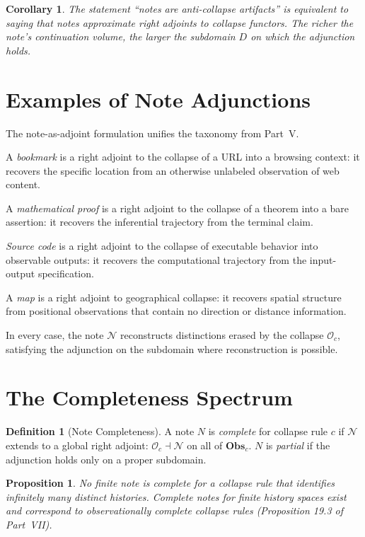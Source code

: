 \documentclass[12pt, a4paper, openany]{book}
\theoremstyle{plain}
\newtheorem{proposition}[theorem]{Proposition}
\newtheorem{corollary}[theorem]{Corollary}
\theoremstyle{definition}
\newtheorem{definition}[theorem]{Definition}
\theoremstyle{remark}
\newcommand{\Obs}{\mathbf{Obs}}
\begin{document}
\begin{corollary}
The statement ``notes are anti-collapse artifacts'' is equivalent to saying that
notes approximate right adjoints to collapse functors. The richer the note's
continuation volume, the larger the subdomain $D$ on which the adjunction holds.
\end{corollary}

\section{Examples of Note Adjunctions}

The note-as-adjoint formulation unifies the taxonomy from Part~V.

A \emph{bookmark} is a right adjoint to the collapse of a URL into a browsing
context: it recovers the specific location from an otherwise unlabeled observation
of web content.

A \emph{mathematical proof} is a right adjoint to the collapse of a theorem
into a bare assertion: it recovers the inferential trajectory from the terminal
claim.

\emph{Source code} is a right adjoint to the collapse of executable behavior
into observable outputs: it recovers the computational trajectory from the
input-output specification.

A \emph{map} is a right adjoint to geographical collapse: it recovers spatial
structure from positional observations that contain no direction or distance
information.

In every case, the note $\mathcal{N}$ reconstructs distinctions erased by the
collapse $\mathcal{O}_c$, satisfying the adjunction on the subdomain where
reconstruction is possible.

\section{The Completeness Spectrum}

\begin{definition}[Note Completeness]
A note $N$ is \emph{complete} for collapse rule $c$ if $\mathcal{N}$ extends to a
global right adjoint: $\mathcal{O}_c \dashv \mathcal{N}$ on all of $\Obs_c$.
$N$ is \emph{partial} if the adjunction holds only on a proper subdomain.
\end{definition}

\begin{proposition}
No finite note is complete for a collapse rule that identifies infinitely many
distinct histories. Complete notes for finite history spaces exist and correspond
to observationally complete collapse rules (Proposition 19.3 of Part~VII).
\end{proposition}
\end{document}
